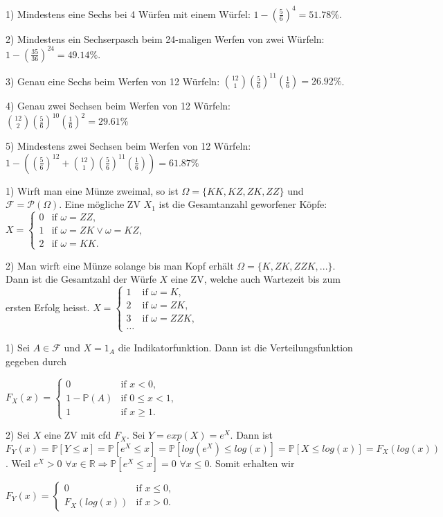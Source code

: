1) Mindestens eine Sechs bei 4 Würfen mit einem Würfel: $1-(\frac{5}{6})^4 = 51.78\%$.

2) Mindestens ein Sechserpasch beim 24-maligen Werfen von zwei Würfeln: $1-(\frac{35}{36})^{24} = 49.14\%$.

3) Genau eine Sechs beim Werfen von 12 Würfeln: ${12\choose 1}(\frac{5}{6})^{11}(\frac{1}{6})=26.92\%$.

4) Genau zwei Sechsen beim Werfen von 12 Würfeln: ${12\choose 2}(\frac{5}{6})^{10}(\frac{1}{6})^2=29.61\%$

5) Mindestens zwei Sechsen beim Werfen von 12 Würfeln: $1 - ((\frac{5}{6})^{12} + {12\choose 1}(\frac{5}{6})^{11}(\frac{1}{6}))=61.87\%$

1) Wirft man eine Münze zweimal, so ist $\Omega=\{KK,KZ,ZK,ZZ\}$ und $\mathcal{F}=\mathcal{P}(\Omega)$. Eine mögliche ZV $X_1$ ist die Gesamtanzahl geworfener Köpfe: $X = \begin{cases}
    0 & \text{if } \omega = ZZ, \\
    1 & \text{if } \omega = ZK \lor \omega = KZ, \\
    2 & \text{if } \omega = KK.
  \end{cases}$

2) Man wirft eine Münze solange bis man Kopf erhält $\Omega=\{K,ZK,ZZK,...\}$. Dann ist die Gesamtzahl der Würfe $X$ eine ZV, welche auch Wartezeit bis zum ersten Erfolg heisst. $X = \begin{cases}
    1 & \text{if } \omega = K, \\
    2 & \text{if } \omega = ZK, \\
    3 & \text{if } \omega = ZZK, \\
    \hdots &
  \end{cases}$


1) Sei $A\in\mathcal{F}$ und $X=1_A$ die Indikatorfunktion. Dann ist die Verteilungsfunktion gegeben durch



$F_X(x) = \begin{cases}
    0 & \text{if } x<0, \\
    1-\mathbb{P}(A) & \text{if } 0\leq x<1, \\
    1 & \text{if } x\geq 1.
\end{cases}$

2) Sei $X$ eine ZV mit cfd $F_X$. Sei $Y=exp(X)=e^X$. Dann ist $F_Y(x)=\mathbb{P}[Y\leq x]=\mathbb{P}[e^X\leq x]=\mathbb{P}[log(e^X)\leq log(x)]=\mathbb{P}[X\leq log(x)]=F_X(log(x))$. Weil $e^X>0$ $\forall x\in\mathbb{R} \Rightarrow \mathbb{P}[e^X\leq x]=0$ $\forall x\leq 0$. Somit erhalten wir
 
$F_Y(x) = \begin{cases}
    0 & \text{if } x\leq 0, \\
    F_X(log(x)) & \text{if } x>0.
\end{cases}$